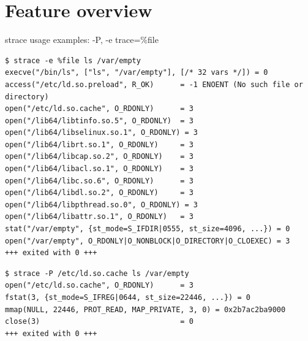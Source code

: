 \documentclass[unicode,aspectratio=169]{beamer}
\begin{document}
\section{Feature overview}

\begin{frame}[fragile]{strace usage examples: -P, -e trace=\%file}
\scriptsize
\begin{verbatim}
$ strace -e %file ls /var/empty
execve("/bin/ls", ["ls", "/var/empty"], [/* 32 vars */]) = 0
access("/etc/ld.so.preload", R_OK)      = -1 ENOENT (No such file or directory)
open("/etc/ld.so.cache", O_RDONLY)      = 3
open("/lib64/libtinfo.so.5", O_RDONLY)  = 3
open("/lib64/libselinux.so.1", O_RDONLY) = 3
open("/lib64/librt.so.1", O_RDONLY)     = 3
open("/lib64/libcap.so.2", O_RDONLY)    = 3
open("/lib64/libacl.so.1", O_RDONLY)    = 3
open("/lib64/libc.so.6", O_RDONLY)      = 3
open("/lib64/libdl.so.2", O_RDONLY)     = 3
open("/lib64/libpthread.so.0", O_RDONLY) = 3
open("/lib64/libattr.so.1", O_RDONLY)   = 3
stat("/var/empty", {st_mode=S_IFDIR|0555, st_size=4096, ...}) = 0
open("/var/empty", O_RDONLY|O_NONBLOCK|O_DIRECTORY|O_CLOEXEC) = 3
+++ exited with 0 +++
\end{verbatim}

\begin{verbatim}
$ strace -P /etc/ld.so.cache ls /var/empty
open("/etc/ld.so.cache", O_RDONLY)      = 3
fstat(3, {st_mode=S_IFREG|0644, st_size=22446, ...}) = 0
mmap(NULL, 22446, PROT_READ, MAP_PRIVATE, 3, 0) = 0x2b7ac2ba9000
close(3)                                = 0
+++ exited with 0 +++
\end{verbatim}
\end{frame}
\end{document}
